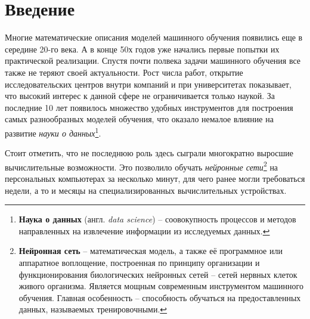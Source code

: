 \documentclass[11pt,a4paper]{extarticle}
\begin{document}
\begin{abstract}
	The algorithm of changing the time of the day on images is a subclass of Machine Learning problems of image translation.
	Image-2-image translation is one of the of computer vision problems, where the goal is to extract style features from image (or set of images) with subsequent applying the pt-model to the base image to generate new images with specified styles while preserving semantic information.
	This area has advanced significantly due to the modern computing capabilities, in particular the training transfer on GPUs.
	Over the past few years, many research papers have appeared on the subjects of crossdomain images translation, styles transfering and colorization.
	This research reveals modern approaches of image translation applicable to problem of changing the time of day on the image.
	A description of the neural network models, the rationale and choice of method for training, and a comparative quality analysis of a series of training experiments are carried out.
	The model and translation results can be applied to augment data in related machine learning problems.
\end{abstract}

\newpage
\tableofcontents
\newpage

\section{Введение}\label{sec:intro}

	Многие математические описания моделей машинного обучения появились еще в середине 20-го века.
	А в конце 50х годов уже начались первые попытки их практической реализации.
	Спустя почти полвека задачи машинного обучения все также не теряют своей актуальности.
	Рост числа работ, открытие исследовательских центров внутри компаний и при университетах показывает,
	что высокий интерес к данной сфере не ограничивается только наукой.
	За последние 10 лет появилось множество удобных инструментов для построения самых разнообразных моделей обучения, что оказало немалое влияние на развитие \textit{науки о данных}\footnote{
		\textbf{Наука о данных} (англ. \textit{data science}) -- соовокупность процессов и методов направленных на извлечение информации из исследуемых данных.
	}.  
	
	Стоит отметить, что не последнюю роль здесь сыграли многократно выросшие вычислительные возможности. 
	Это позволило обучать \textit{нейронные сети}\footnote{
		\textbf{Нейронная сеть} --  математическая модель, а также её программное или аппаратное воплощение, 
		построенная по принципу организации и функционирования биологических нейронных сетей -- сетей нервных клеток живого организма.
		Является мощным современным инструментом машинного обучения.
		Главная особенность -- способность обучаться на предоставленных данных, называемых тренировочными.
	} на персональных компьютерах за несколько минут, для чего ранее могли требоваться недели, а то и месяцы на специализированных вычислительных устройствах.
\end{document}
